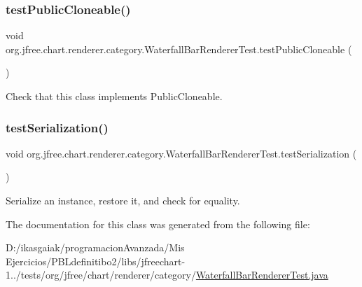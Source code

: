\subsubsection{\texorpdfstring{test\+Public\+Cloneable()}{testPublicCloneable()}}
{\footnotesize\ttfamily void org.\+jfree.\+chart.\+renderer.\+category.\+Waterfall\+Bar\+Renderer\+Test.\+test\+Public\+Cloneable (\begin{DoxyParamCaption}{ }\end{DoxyParamCaption})}

Check that this class implements Public\+Cloneable. \mbox{\label{classorg_1_1jfree_1_1chart_1_1renderer_1_1category_1_1_waterfall_bar_renderer_test_a9ded8fbc3102ea899e0f5a9fefad41fd}} 
\subsubsection{\texorpdfstring{test\+Serialization()}{testSerialization()}}
{\footnotesize\ttfamily void org.\+jfree.\+chart.\+renderer.\+category.\+Waterfall\+Bar\+Renderer\+Test.\+test\+Serialization (\begin{DoxyParamCaption}{ }\end{DoxyParamCaption})}

Serialize an instance, restore it, and check for equality. 

The documentation for this class was generated from the following file\+:\begin{DoxyCompactItemize}
\item 
D\+:/ikasgaiak/programacion\+Avanzada/\+Mis Ejercicios/\+P\+B\+Ldefinitibo2/libs/jfreechart-\/1../tests/org/jfree/chart/renderer/category/\mbox{\hyperlink{_waterfall_bar_renderer_test_8java}{Waterfall\+Bar\+Renderer\+Test.\+java}}\end{DoxyCompactItemize}

